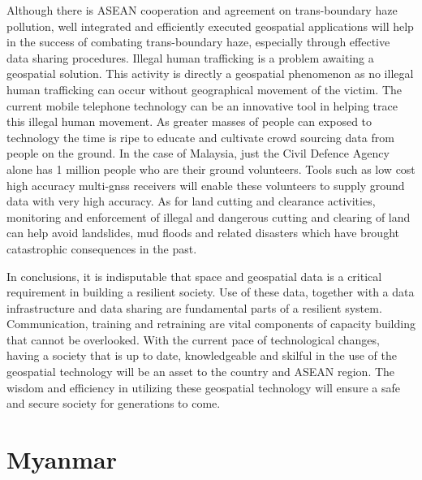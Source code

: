 {{\vspace{0.4 cm}
  
	Although there is ASEAN cooperation and agreement on trans-boundary haze pollution, well integrated and efficiently executed geospatial applications will help in the success of combating trans-boundary haze, especially through effective data sharing procedures. Illegal human trafficking is a problem awaiting a geospatial solution. This activity is directly a geospatial phenomenon as no illegal human trafficking can occur without geographical movement of the victim. The current mobile telephone technology can be an innovative tool in helping trace this illegal human movement. As greater masses of people can exposed to technology the time is ripe to educate and cultivate crowd sourcing data from people on the ground. In the case of Malaysia, just the Civil Defence Agency alone has 1 million people who are their ground volunteers. Tools such as low cost high accuracy multi-gnss receivers will enable these volunteers to supply ground data with very high accuracy. As for land cutting and clearance activities, monitoring and enforcement of illegal and dangerous cutting and clearing of land can help avoid landslides, mud floods and related disasters which have brought catastrophic consequences in the past.
		
\vspace{0.4 cm}
  
In conclusions, it is indisputable that space and geospatial data is a critical requirement in building a resilient society. Use of these data, together with a data infrastructure and data sharing are fundamental  parts of a resilient system. Communication, training and retraining are vital components of capacity building that cannot be overlooked. With the current pace of technological changes, having a society that is up to date, knowledgeable and skilful in the use of the geospatial technology will be an asset to the country and ASEAN region. The wisdom and efficiency in utilizing these geospatial technology will ensure a safe and secure society for generations to come. 

\par}
}


\section{Myanmar}

\vspace{0.5 cm}

